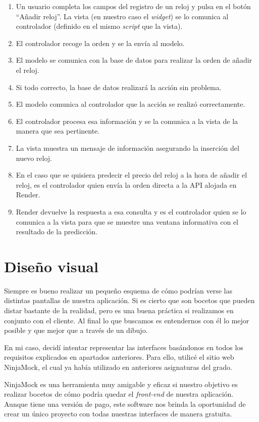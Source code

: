 	\begin{enumerate}
		\item Un usuario completa los campos del registro de un reloj y pulsa en el botón ``Añadir reloj''. La vista (en nuestro caso el \emph{widget}) se lo comunica al controlador (definido en el mismo \emph{script} que la vista).
		\item El controlador recoge la orden y se la envía al modelo.
		\item El modelo se comunica con la base de datos para realizar la orden de añadir el reloj.
		\item Si todo correcto, la base de datos realizará la acción sin problema.
		\item El modelo comunica al controlador que la acción se realizó correctamente.
		\item El controlador procesa esa información y se la comunica a la vista de la manera que sea pertinente.
		\item La vista muestra un mensaje de información asegurando la inserción del nuevo reloj.
		\item En el caso que se quisiera predecir el precio del reloj a la hora de añadir el reloj, es el controlador quien envía la orden directa a la API alojada en Render.
		\item Render devuelve la respuesta a esa consulta y es el controlador quien se lo comunica a la vista para que se muestre una ventana informativa con el resultado de la predicción.
	\end{enumerate}

\section{Diseño visual}

	Siempre es bueno realizar un pequeño esquema de cómo podrían verse las distintas pantallas de nuestra aplicación. Si es cierto que son bocetos que pueden distar bastante de la realidad, pero es una buena práctica si realizamos en conjunto con el cliente. Al final lo que buscamos es entendernos con él lo mejor posible y que mejor que a través de un dibujo.
	
	En mi caso, decidí intentar representar las interfaces basándonos en todos los requisitos explicados en apartados anteriores. Para ello, utilicé el sitio web NinjaMock, el cual ya había utilizado en anteriores asignaturas del grado.
	
	NinjaMock es una herramienta muy amigable y eficaz si nuestro objetivo es realizar bocetos de cómo podría quedar el \emph{front-end} de nuestra aplicación. Aunque tiene una versión de pago, este software nos brinda la oportunidad de crear un único proyecto con todas nuestras interfaces de manera gratuita.
	
